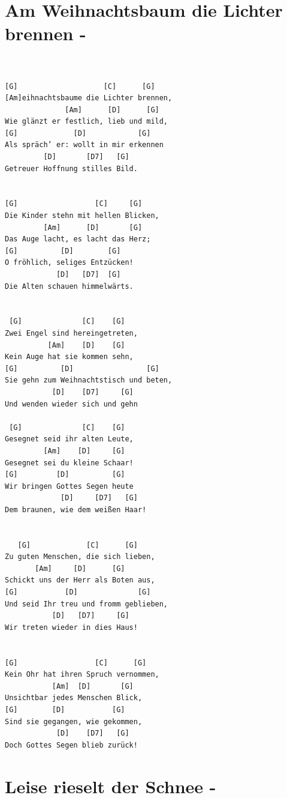 \documentclass[]{book}
\let\stdsection\section
\renewcommand\section{\clearpage\stdsection}
\begin{document}
\hypertarget{am-weihnachtsbaum-die-lichter-brennen--}{%
\section{Am Weihnachtsbaum die Lichter brennen -}\label{am-weihnachtsbaum-die-lichter-brennen--}}

\begin{verbatim}


[G]                    [C]      [G]
[Am]eihnachtsbaume die Lichter brennen,
              [Am]      [D]      [G]
Wie glänzt er festlich, lieb und mild,
[G]             [D]            [G]
Als spräch’ er: wollt in mir erkennen
         [D]       [D7]   [G]
Getreuer Hoffnung stilles Bild.


[G]                  [C]     [G]
Die Kinder stehn mit hellen Blicken,
         [Am]      [D]       [G]
Das Auge lacht, es lacht das Herz;
[G]          [D]        [G]
O fröhlich, seliges Entzücken!
            [D]   [D7]  [G]
Die Alten schauen himmelwärts.


 [G]              [C]    [G]
Zwei Engel sind hereingetreten,
          [Am]    [D]    [G]
Kein Auge hat sie kommen sehn,
[G]          [D]                 [G]
Sie gehn zum Weihnachtstisch und beten,
           [D]    [D7]     [G]
Und wenden wieder sich und gehn
 
 [G]              [C]    [G]
Gesegnet seid ihr alten Leute,
         [Am]    [D]     [G]
Gesegnet sei du kleine Schaar!
[G]         [D]          [G]
Wir bringen Gottes Segen heute
             [D]     [D7]   [G]
Dem braunen, wie dem weißen Haar!


   [G]             [C]      [G]
Zu guten Menschen, die sich lieben,
       [Am]     [D]      [G]
Schickt uns der Herr als Boten aus,
[G]           [D]              [G]
Und seid Ihr treu und fromm geblieben,
           [D]   [D7]     [G]
Wir treten wieder in dies Haus!
 

[G]                  [C]      [G]
Kein Ohr hat ihren Spruch vernommen,
           [Am]  [D]       [G]
Unsichtbar jedes Menschen Blick,
[G]        [D]           [G]
Sind sie gegangen, wie gekommen,
            [D]    [D7]   [G]
Doch Gottes Segen blieb zurück!
\end{verbatim}

\hypertarget{leise-rieselt-der-schnee--}{%
\section{Leise rieselt der Schnee -}\label{leise-rieselt-der-schnee--}}
\end{document}
